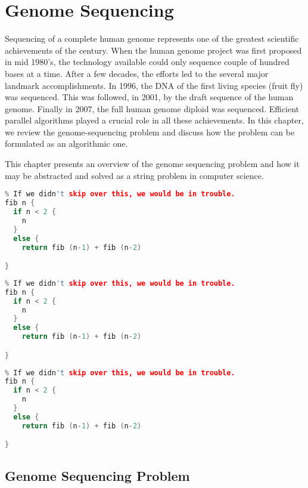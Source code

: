 \chapter{Genome Sequencing}
\label{genome}

\begin{preamble}
Sequencing of a complete human genome represents one of the greatest
scientific achievements of the century.
%
When the human genome project was first proposed in mid 1980's, the
technology available could only sequence couple of hundred bases at a
time.
%
After a few decades, the efforts led to the several major landmark
accomplishments.
%
In 1996, the DNA of the first living species (fruit fly) was sequenced. 
%
This was followed, in 2001, by the draft sequence of the human genome.
%
Finally in 2007, the full human genome diploid was sequenced.
%
Efficient parallel algorithms played a crucial role in all these
achievements.  In this chapter, we review the genome-sequencing
problem and discuss how the problem can be formulated as an
algorithmic one.

This chapter presents an overview of the genome sequencing problem and how it may be abstracted and solved as a string problem in computer science.
\end{preamble}


\begin{lstlisting}[language=c]
% Here is a latex comment
% If we didn't skip over this, we would be in trouble.
fib n {
  if n < 2 {
    n
  }
  else {
    return fib (n-1) + fib (n-2)

}
\end{lstlisting}

\begin{lstlisting}[language=c]
% Here is a latex comment
% If we didn't skip over this, we would be in trouble.
fib n {
  if n < 2 {
    n
  }
  else {
    return fib (n-1) + fib (n-2)

}
\end{lstlisting}

\begin{lstlisting}[language=c]
% Here is a latex comment
% If we didn't skip over this, we would be in trouble.
fib n {
  if n < 2 {
    n
  }
  else {
    return fib (n-1) + fib (n-2)

}
\end{lstlisting}


\section{Genome Sequencing Problem}
\label{genome::prob}




